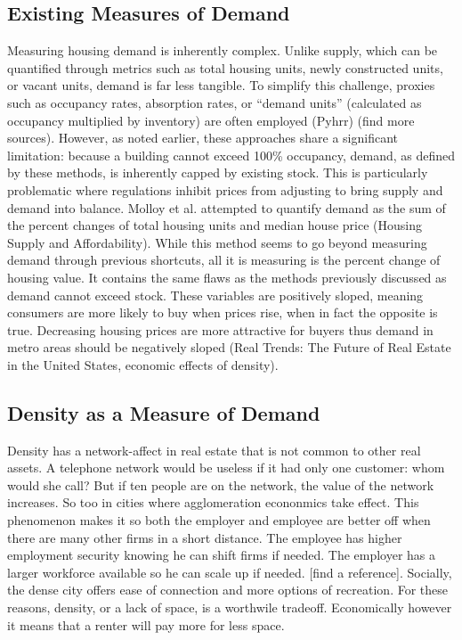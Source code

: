 \documentclass[sn-mathphys-num]{sn-jnl}%
\theoremstyle{thmstyleone}%
\theoremstyle{thmstyletwo}%
\theoremstyle{thmstylethree}%
\begin{document}
\subsection{Existing Measures of Demand}
Measuring housing demand is inherently complex. Unlike supply, which can be quantified through metrics such as total housing units, newly constructed units, or vacant units, demand is far less tangible. To simplify this challenge, proxies such as occupancy rates, absorption rates, or “demand units” (calculated as occupancy multiplied by inventory) are often employed (Pyhrr) (find more sources). However, as noted earlier, these approaches share a significant limitation: because a building cannot exceed 100\% occupancy, demand, as defined by these methods, is inherently capped by existing stock. This is particularly problematic where regulations inhibit prices from adjusting to bring supply and demand into balance. Molloy et al. attempted to quantify demand as the sum of the percent changes of total housing units and median house price (Housing Supply and Affordability). While this method seems to go beyond measuring demand through previous shortcuts, all it is measuring is the percent change of housing value. It contains the same flaws as the methods previously discussed as demand cannot exceed stock. These variables are positively sloped, meaning consumers are more likely to buy when prices rise, when in fact the opposite is true. Decreasing housing prices are more attractive for buyers thus demand in metro areas should be negatively sloped (Real Trends: The Future of Real Estate in the United States, economic effects of density). 
\subsection{Density as a Measure of Demand}
Density has a network-affect in real estate that is not common to other real assets. A telephone network would be useless if it had only one customer: whom would she call? But if ten people are on the network, the value of the network increases. So too in cities where agglomeration econonmics take effect. This phenomenon makes it so both the employer and employee are better off when there are many other firms in a short distance. The employee has higher employment security knowing he can shift firms if needed. The employer has a larger workforce available so he can scale up if needed. [find a reference]. Socially, the dense city offers ease of connection and more options of recreation. For these reasons, density, or a lack of space, is a worthwile tradeoff. Economically however it means that a renter will pay more for less space.
\end{document}
